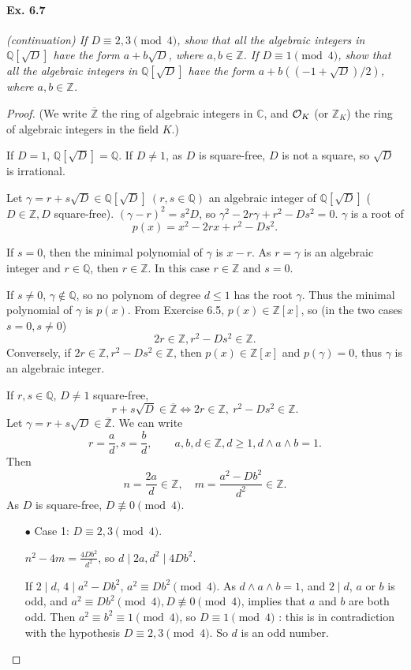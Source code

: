 \documentclass[11pt,a4paper]{article}
\newcommand{\Q}{\mathbb{Q}}
\newcommand{\Z}{\mathbb{Z}}
\newcommand{\C}{\mathbb{C}}
\begin{document}
\paragraph{Ex. 6.7}

{\it (continuation) If $D \equiv 2, 3  \pmod 4$, show that all the algebraic integers in $\Q[\sqrt{D}]$ have the form $a + b \sqrt{D}$, where $a, b \in \Z$. If $D \equiv 1  \pmod 4$, show that all the algebraic integers in $\Q[\sqrt{D}]$ have the form $a + b((-1 + \sqrt{D})/2)$, where $a, b \in \Z$.
}

\begin{proof}
(We write $\overline{\Z}$ the ring of algebraic integers in $\C$, and ${\cal O}_K$ (or $\Z_K$) the ring of algebraic integers in the field $K$.)

If $D=1$, $\Q[\sqrt{D}] = \Q$. If $D \neq 1$, as $D$ is square-free, $D$ is not a square, so $\sqrt{D}$ is irrational.

Let $\gamma = r + s \sqrt{D} \in \Q[\sqrt{D}]\ (r,s \in \Q)$ an algebraic integer of $\Q[\sqrt{D}]$ ($D\in \Z, D$ square-free).
$(\gamma - r)^2 = s^2 D$, so  $\gamma^2 - 2r\gamma +r^2 - Ds^2 = 0$. $\gamma$ is a root of 
$$p(x) = x^2-2rx+r^2-Ds^2.$$

If $s = 0$, then the minimal polynomial of $\gamma$ is $x-r$.  As $r = \gamma $ is an algebraic integer and $r\in \Q$, then $r\in \Z$. In this case $r\in \Z$ and $s=0$.

If $s\neq 0$, $\gamma \not \in \Q$, so no polynom of degree $d\leq 1$ has the root $\gamma$. Thus the minimal polynomial of $\gamma$ is $p(x)$. From Exercise 6.5, $p(x) \in \Z[x]$, so (in the two cases $s=0,s\neq 0$)
$$2r \in \Z, r^2-Ds^2 \in \Z.$$
Conversely, if $2r \in \Z, r^2-Ds^2 \in \Z$, then $p(x)\in \Z[x]$ and $p(\gamma) = 0$, thus $\gamma$ is an algebraic integer.

If  $r,s \in \Q$, $D\neq 1$ square-free,
$$r+s\sqrt{D} \in \overline{\Z}  \iff 2r \in \Z,\  r^2-Ds^2 \in \Z.$$
Let $\gamma =  r + s \sqrt{D} \in \overline{\Z}$.
We can write $$r = \frac{a}{d}, s = \frac{b}{d}, \qquad a,b,d \in \Z, d\geq 1, d\wedge a \wedge b = 1.$$
Then
$$n = \frac{2a}{d} \in \Z, \quad m = \frac{a^2-Db^2}{d^2} \in \Z.$$
As $D$ is square-free, $D\not \equiv 0 \pmod 4$.
\begin{enumerate}
\item[$\bullet$] Case 1: $D \equiv 2,3 \pmod 4$.

$n^2-4m = \frac{4Db^2}{d^2}$, so $d \mid 2a, d^2 \mid 4Db^2$.

If $2\mid d$, $4 \mid a^2-Db^2$, $a^2 \equiv Db^2 \pmod 4$.
As $d\wedge a \wedge b = 1$, and $2 \mid d$, $a$ or $b$ is odd, and $a^2 \equiv Db^2 \pmod 4, D \not \equiv 0 \pmod 4$, implies that $a$ and $b$ are both odd. Then $a^2 \equiv b^2 \equiv 1 \pmod 4$, so $D \equiv 1 \pmod 4$ : this is in contradiction with the hypothesis $D \equiv 2,3 \pmod 4$. So $d$ is an odd number.


\end{enumerate}
\end{proof}
\end{document}
